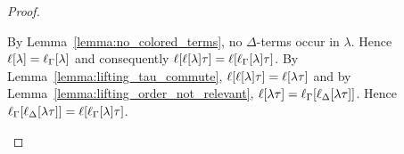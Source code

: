 \documentclass[,%
	draft=false,%
	numbers=noendperiod
	11pt,
	a4paper,
	oneside,%
	openany,
]{memoir}
\begin{document}
\begin{proof}
\begin{description}
			By Lemma~\ref{lemma:no_colored_terms}, no $\Delta$-terms occur in $\lambda$.
			Hence 
			$\ell[\lambda] = \ell_{\Gamma}[\lambda]$ and consequently
			$\ell[\ell[\lambda]\tau] = \ell[\ell_{\Gamma}[\lambda]\tau]$.
			By Lemma~\ref{lemma:lifting_tau_commute}, $\ell[\ell[\lambda]\tau] = \ell[\lambda\tau]$ and by Lemma~\ref{lemma:lifting_order_not_relevant}, $\ell[\lambda\tau] = \ell_{\Gamma}[\ell_{\Delta}[\lambda\tau]]$.
			Hence $\ell_{\Gamma}[\ell_{\Delta}[\lambda\tau]] = \ell[\ell_{\Gamma}[\lambda]\tau]$.
			\begin{comment}
			Hence it suffices to show that for a literal $\lambda$ in $\LIde(C_i)$ or $\LIclde(C_i)$ and its corresponding literal $\kappa$ in $\LI(C_i)$ or $\LIcl(C_i)$ for some $C_i \in \bbar C$
			that $\lifgammanovar{ \lifdeltanovar{\lambda\tau} } = \lifboth{\kappa\tau}$.

			By the induction hypothesis, $\lifgammanovar{\lambda} = \kappa$.
			By Lemma~\ref{lemma:no_colored_terms}, no $\Delta$-terms occur in $\lambda$.
			Hence 
			$\lifboth{\lambda} = \kappa$ and also
			$\lifboth{\lifboth{\lambda}\tau} = \lifboth{\kappa\tau}$.
			By Lemma~\ref{lemma:lifting_tau_commute},
			$\lifboth{\lambda\tau} = \lifboth{\kappa\tau}$, 
			which by Lemma~\ref{lemma:lifting_order_not_relevant} is nothing else than
			$\lifgammanovar{\lifdeltanovar{\lambda\tau}} = \lifboth{\kappa\tau}$.
		\end{comment}
			\begin{comment}

				For the induction step, it suffices to show that for a literal $\lambda$ with $\lifgammanovar{\lambda} = \kappa$
				that $\lifgammanovar{\lifdeltanovar{\lambda} \tau} = \lifboth{\kappa\tau}$.

				We abbreviate\
				$C_1\setminus \{l\}$ by $C_1^*$ and
				$C_2\setminus \{\lnot l'\}$ by $C_2^*$.

				Note that each literal in $\LIclde(C)$ is of the form $\lifdeltanovar{\lambda\tau}$ for some literal $\lambda$ in $\LIclde(C_1)$ or $\LIclde(C_2)$.
				Hence by the induction hypothesis, $\lifgammanovar{\lambda}$ is contained in $\LIcl(C_1)$ or $\LIcl(C_1)$.
				Note that every literal in $\LIcl(C)$ is of this form $\lifboth{\lifgammanovar{\lambda}\tau}$ for some $\lambda$ in $\LIclde(C_1)$ or $\LIclde(C_2)$.
				We show that $\lifboth{\lifgammanovar{\lambda}\tau} = \lifgammanovar{\lifdeltanovar{\lambda\tau}}$.


\end{comment}
\end{description}
\end{proof}
\end{document}
